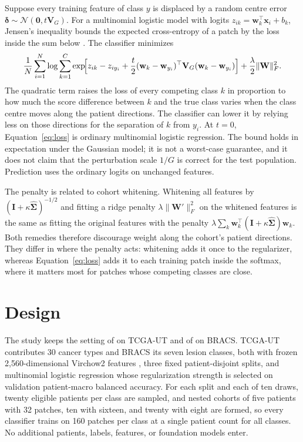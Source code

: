 \documentclass[11pt]{article}
\begin{document}
Suppose every training feature of class $y$ is displaced by a random centre error $\boldsymbol\delta\sim\mathcal N(\mathbf 0,t\mathbf V_G)$. For a multinomial logistic model with logits $z_{ik}=\mathbf w_k^\top\mathbf x_i+b_k$, Jensen's inequality bounds the expected cross-entropy of a patch by the loss inside the sum below \citep{wang2019isda}. The classifier minimizes
\begin{equation}
  \frac1N\sum_{i=1}^{N}
  \log\sum_{k=1}^{C}\exp\!\Bigl[
  z_{ik}-z_{iy_i}
  +\frac{t}{2}(\mathbf w_k-\mathbf w_{y_i})^\top\mathbf V_G(\mathbf w_k-\mathbf w_{y_i})
  \Bigr]
  +\frac{\lambda}{2}\lVert\mathbf W\rVert_F^2 .
  \label{eq:loss}
\end{equation}
\noindent The quadratic term raises the loss of every competing class $k$ in proportion to how much the score difference between $k$ and the true class varies when the class centre moves along the patient directions. The classifier can lower it by relying less on those directions for the separation of $k$ from $y_i$. At $t=0$, Equation~\ref{eq:loss} is ordinary multinomial logistic regression. The bound holds in expectation under the Gaussian model; it is not a worst-case guarantee, and it does not claim that the perturbation scale $1/G$ is correct for the test population. Prediction uses the ordinary logits on unchanged features.

The penalty is related to cohort whitening. Whitening all features by $(\mathbf I+\kappa\hat{\boldsymbol\Sigma})^{-1/2}$ and fitting a ridge penalty $\lambda\lVert\mathbf W'\rVert_F^2$ on the whitened features is the same as fitting the original features with the penalty $\lambda\sum_k\mathbf w_k^\top(\mathbf I+\kappa\hat{\boldsymbol\Sigma})\mathbf w_k$. Both remedies therefore discourage weight along the cohort's patient directions. They differ in where the penalty acts: whitening adds it once to the regularizer, whereas Equation~\ref{eq:loss} adds it to each training patch inside the softmax, where it matters most for patches whose competing classes are close.

\section{Design}
\label{sec:design}
The study keeps the setting of \citet{queisler2026centreError} on TCGA-UT and of \citet{queisler2026bracsMechanism} on BRACS. TCGA-UT contributes 30 cancer types and BRACS its seven lesion classes, both with frozen 2,560-dimensional Virchow2 features \citep{zimmermann2024virchow2}, three fixed patient-disjoint splits, and multinomial logistic regression whose regularization strength is selected on validation patient-macro balanced accuracy. For each split and each of ten draws, twenty eligible patients per class are sampled, and nested cohorts of five patients with 32 patches, ten with sixteen, and twenty with eight are formed, so every classifier trains on 160 patches per class at a single patient count for all classes. No additional patients, labels, features, or foundation models enter.
\end{document}
